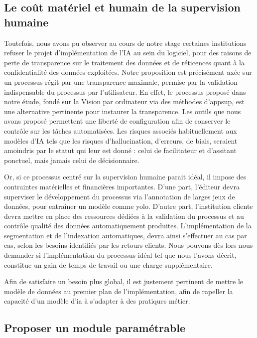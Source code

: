 \subsection{Le coût matériel et humain de la supervision humaine}
Toutefois, nous avons pu observer au cours de notre stage certaines institutions refuser le projet d'implémentation de l'IA au sein du logiciel, pour des raisons de perte de transparence sur le traitement des données et de réticences quant à la confidentialité des données exploitées. Notre proposition est précisément axée sur un processus régit par une transparence maximale, permise par la validation indispensable du processus par l'utilisateur. En effet, le processus proposé dans notre étude, fondé sur la \gls{Vision par ordinateur} via des méthodes d'\gls{appsup}, est une alternative pertinente pour instaurer la transparence. Les outils que nous avons proposé permettent une liberté de configuration afin de conserver le contrôle sur les tâches automatisées. Les risques associés habituellement aux modèles d'IA tels que les risques d'hallucination, d'erreurs, de biais, seraient amoindris par le statut qui leur est donné : celui de facilitateur et d'assitant ponctuel, mais jamais celui de décisionnaire. 

Or, si ce processus centré sur la supervision humaine parait idéal, il impose des contraintes matérielles et financières importantes. D'une part, l'éditeur devra superviser le développement du processus via l'annotation de larges jeux de données, pour entraîner un modèle comme \gls{yolo}. D'autre part, l'institution cliente devra mettre en place des ressources dédiées à la validation du processus et au contrôle qualité des données automatiquement produites. L'implémentation de la segmentation et de l'indexation automatiques, devra ainsi s'effectuer au cas par cas, selon les besoins identifiés par les retours clients. Nous pouvons dès lors nous demander si l'implémentation du processus idéal tel que nous l'avons décrit, constitue un gain de temps de travail ou une charge supplémentaire.

Afin de satisfaire un besoin plus global, il est justement pertinent de mettre le modèle de données au premier plan de l'implémentation, afin de rapeller la capacité d'un modèle d'\gls{ia} à s'adapter à des pratiques métier.


\subsection{Proposer un module paramétrable}

